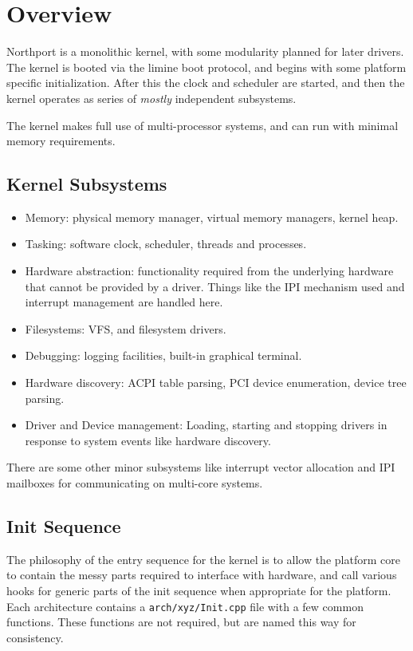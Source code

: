 \section{Overview}
Northport is a monolithic kernel, with some modularity planned for later drivers. The kernel is booted via the limine boot protocol, and begins with some platform specific initialization. After this the clock and scheduler are started, and then the kernel operates as series of \textit{mostly} independent subsystems.

The kernel makes full use of multi-processor systems, and can run with minimal memory requirements.

\subsection{Kernel Subsystems}
\begin{itemize}
    \item Memory: physical memory manager, virtual memory managers, kernel heap.
    \item Tasking: software clock, scheduler, threads and processes.
    \item Hardware abstraction: functionality required from the underlying hardware that cannot be provided by a driver. Things like the IPI mechanism used and interrupt management are handled here.
    \item Filesystems: VFS, and filesystem drivers.
    \item Debugging: logging facilities, built-in graphical terminal.
    \item Hardware discovery: ACPI table parsing, PCI device enumeration, device tree parsing.
    \item Driver and Device management: Loading, starting and stopping drivers in response to system events like hardware discovery.
\end{itemize}

There are some other minor subsystems like interrupt vector allocation and IPI mailboxes for communicating on multi-core systems.

\subsection{Init Sequence}
The philosophy of the entry sequence for the kernel is to allow the platform core to contain the messy parts required to interface with hardware, and call various hooks for generic parts of the init sequence when appropriate for the platform. Each architecture contains a \verb|arch/xyz/Init.cpp| file with a few common functions. These functions are not required, but are named this way for consistency.

